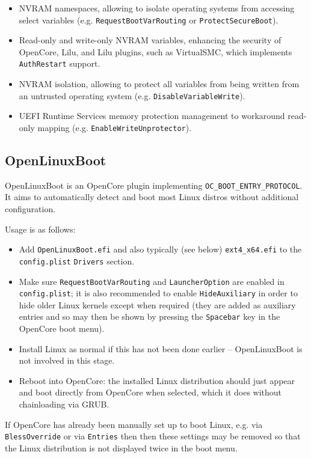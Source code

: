 \documentclass[]{article}
\providecommand{\tightlist}{%
  \setlength{\itemsep}{0pt}\setlength{\parskip}{0pt}}
\begin{document}
\begin{itemize}
  \item NVRAM namespaces, allowing to isolate operating systems from accessing select
  variables (e.g. \texttt{RequestBootVarRouting} or \texttt{ProtectSecureBoot}).
  \item Read-only and write-only NVRAM variables, enhancing the security of OpenCore,
  Lilu, and Lilu plugins, such as VirtualSMC, which implements \texttt{AuthRestart} support.
  \item NVRAM isolation, allowing to protect all variables from being written from
  an untrusted operating system (e.g. \texttt{DisableVariableWrite}).
  \item UEFI Runtime Services memory protection management to workaround read-only
  mapping (e.g. \texttt{EnableWriteUnprotector}).
\end{itemize}

\subsection{OpenLinuxBoot}\label{uefilinux}

OpenLinuxBoot is an OpenCore plugin implementing \texttt{OC\_BOOT\_ENTRY\_PROTOCOL}.
It aims to automatically detect and boot most Linux distros without additional configuration.

Usage is as follows:

\begin{itemize}
\tightlist
  \item Add \texttt{OpenLinuxBoot.efi} and also typically (see below) \texttt{ext4\_x64.efi} to the \texttt{config.plist}
  \texttt{Drivers} section.
  \item Make sure \texttt{RequestBootVarRouting} and \texttt{LauncherOption} are enabled in \texttt{config.plist};
  it is also recommended to enable \texttt{HideAuxiliary} in order to hide older Linux kernels except when required
  (they are added as auxiliary entries and so may then be shown by pressing the \texttt{Spacebar} key in the OpenCore boot menu).
  \item Install Linux as normal if this has not been done earlier -- OpenLinuxBoot is not involved in this stage.
  \item Reboot into OpenCore: the installed Linux distribution should just appear and boot directly from OpenCore
  when selected, which it does without chainloading via GRUB.
\end{itemize}

If OpenCore has already been manually set up to boot Linux, e.g. via \texttt{BlessOverride} or via \texttt{Entries} then
then these settings may be removed so that the Linux distribution is not displayed twice in the boot menu.
\end{document}
